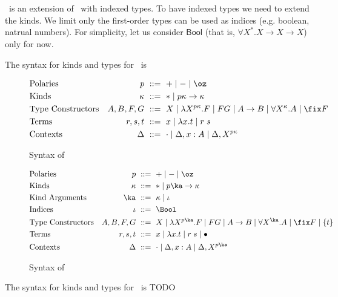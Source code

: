 \section{\Fixi}
\Fixi\ is an extension of \Fixw\ with indexed types.
To have indexed types we need to extend the kinds.
We limit only the first-order types can be used as indices
(e.g. boolean, natrual numbers).
For simplicity, let us consider $\mathsf{Bool}$
(that is, $\forall X^*.X\to X\to X$) only for now.


The syntax for kinds and types for \Fixw\ is
\begin{figure}
\begin{align*}
&\text{Polaries}
	& p		&~ ::= ~ + \mid - \mid \oz
\\
&\text{Kinds}
	& \kappa	&~ ::= ~ * \mid p\kappa \to \kappa
\\
&\text{Type Constructors}
	& A,B,F,G	&~ ::= ~ X
			\mid \lambda X^{p\kappa}.F
			\mid F G
			\mid A\to B
			\mid \forall X^\kappa . A
			\mid \fix F
\\
&\text{Terms}
	& r,s,t		&~ ::= ~ x \mid \lambda x.t \mid r\;s
\\
&\text{Contexts}
	& \Delta	&~ ::= ~ \cdot
			\mid \Delta, x:A
			\mid \Delta, X^{p\kappa}
\end{align*}
\caption{Syntax of \Fixw}
\label{fig:syntaxFixw}
\end{figure}

\begin{figure}
\begin{align*}
&\text{Polaries}
	& p			&~ ::= ~ + \mid - \mid \oz
\\
&\text{Kinds}
 	& \kappa		&~ ::= ~ *
				\mid  p\ka \to \kappa
\\
&\text{Kind Arguments}
	& \ka	&~ ::= ~ \kappa \mid \iota
\\
&\text{Indices}
	& \iota &~::=~ \Bool %
\\
&\text{Type Constructors}
	& A,B,F,G		&~ ::= ~ X
				\mid \lambda X^{p\ka}.F
				\mid F G
				\mid A\to B
				\mid \forall X^\ka . A
				\mid \fix F
				\mid \{t\}
\\
&\text{Terms}
	& r,s,t			&~ ::= ~ x \mid \lambda x.t \mid r\;s
				\mid \bullet
\\
&\text{Contexts}
	& \Delta		&~ ::= ~ \cdot
				\mid \Delta, x : A
				\mid \Delta, X^{p\ka}
\end{align*}
\caption{Syntax of \Fixi}
\label{fig:syntaxFixi}
\end{figure}

The syntax for kinds and types for \Fixi\ is TODO


